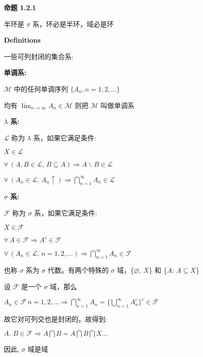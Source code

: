 \documentclass[UTF8]{book}
\begin{document}
\vspace*{12pt}

\textbf{命题 1.2.1}\par
半环是 $\pi$ 系，环必是半环，域必是环\par

\vspace*{12pt}


\newpage
\textbf{Definitions}\par

\vspace*{12pt}

一些可列封闭的集合系:\par

\textbf{单调系:}\par
\quad{} $\mathscr{M}$ 中的任何单调序列 $\{A_n,n=1,2,\ldots\}$ \par
\quad\quad 均有 $\lim_{n\to \infty} A_n\in \mathscr{M}$ 
则把 $\mathscr{M}$ 叫做单调系\par

\vspace*{12pt}

\textbf{$\lambda$ 系:} \par
\quad{} $\mathscr{L}$ 称为 $\lambda$ 系，如果它满足条件:\par
\quad\quad$X\in \mathscr{L}$\par
\quad\quad$\forall \,(A,B \in \mathscr{L} ,\, B\subseteq A)\Longrightarrow A\backslash B \in \mathscr{L}$\par
\quad\quad$\forall\,(A_n\in \mathscr{L},\,A_n \uparrow) \Longrightarrow\bigcap_{n=1}^\infty A_n\in \mathscr{L}$\par

\vspace*{12pt}

\textbf{$\sigma$ 系:} \par
\quad{} $\mathscr{F}$ 称为 $\sigma$ 系，如果它满足条件:\par
\quad\quad$X\in \mathscr{F}$\par
\quad\quad$\forall \,A\in \mathscr{F}\Longrightarrow A^c \in \mathscr{F}$\par
\quad\quad$\forall\,(A_n\in \mathscr{L},\,n=1,2,\ldots) \Longrightarrow\bigcap_{n=1}^\infty A_n\in \mathscr{F}$\par
也称 $\sigma$ 系为 $\sigma$ 代数。有两个特殊的 $\sigma$ 域，\{$\varnothing,\,X$\} 和 \{$A: \,A\subseteq X$\}\par

设 $\mathscr{F}$ 是一个 $\sigma$ 域，那么\par
$A_n\in \mathscr{F}\,n=1,2,\ldots\Longrightarrow \bigcap_{n=1}^\infty A_n = \{\bigcup_{n=1}^\infty A_n^c\}^c\in \mathscr{F} $\par
故它对可列交也是封闭的。故得到:\par
$A,\,B \in\mathscr{F}\Longrightarrow A \bigcap B = A\bigcap B \bigcap X\ldots$\par
因此, $\sigma$ 域是域\par
\end{document}
